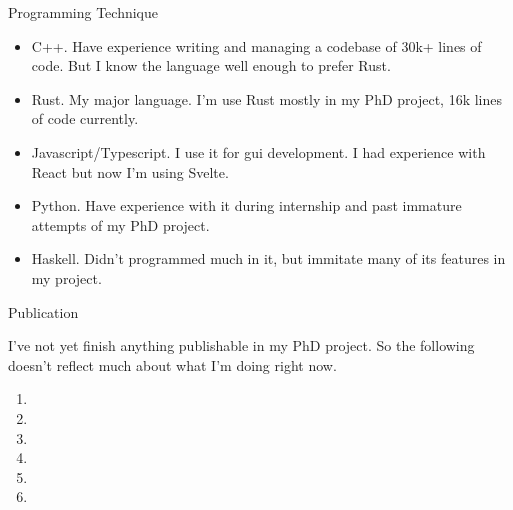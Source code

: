\documentclass{resume} %
\begin{document}
\begin{rSection}{Programming Technique}
\begin{itemize}
	\item C++. Have experience writing and managing a codebase of 30k+ lines of code. But I know the language well enough to prefer Rust.
	\item Rust. My major language. I'm use Rust mostly in my PhD project, 16k lines of code currently.
	\item Javascript/Typescript. I use it for gui development. I had experience with React but now I'm using Svelte.
	\item Python. Have experience with it during internship and past immature attempts of my PhD project.
	\item Haskell. Didn't programmed much in it, but immitate many of its features in my project.
\end{itemize}
\end{rSection}

\begin{rSection}{Publication}

I've not yet finish anything publishable in my PhD project. So the following doesn't reflect much about what I'm doing right now.

\begin{enumerate}
	\item {}
	\item {}
	\item {}
	\item {}
	\item {}
	\item {}
\end{enumerate}
\end{rSection}
\end{document}
